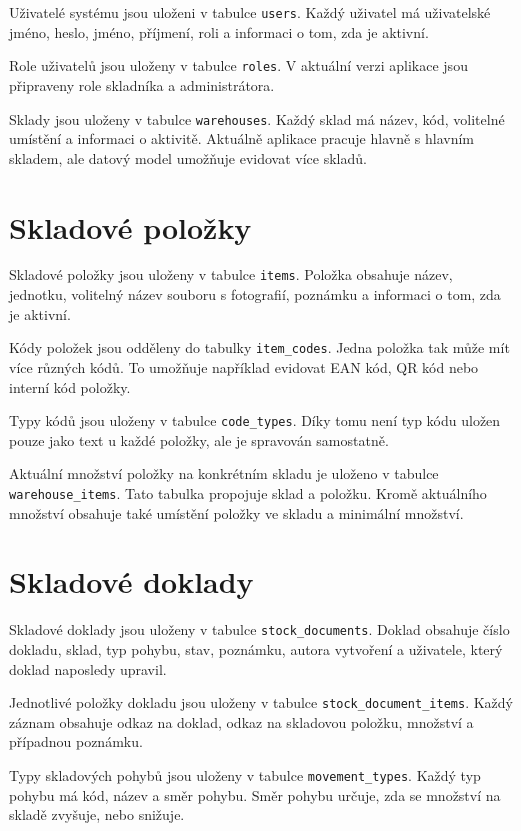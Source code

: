 \documentclass[czech, oth, kiv, he, pdf, viewonly]{fasthesis}
\begin{document}
Uživatelé systému jsou uloženi v tabulce \texttt{users}. Každý
uživatel má uživatelské jméno, heslo, jméno, příjmení, roli a informaci
o tom, zda je aktivní.

Role uživatelů jsou uloženy v tabulce \texttt{roles}. V aktuální verzi
aplikace jsou připraveny role skladníka a administrátora.

Sklady jsou uloženy v tabulce \texttt{warehouses}. Každý sklad má
název, kód, volitelné umístění a informaci o aktivitě. Aktuálně
aplikace pracuje hlavně s hlavním skladem, ale datový model umožňuje
evidovat více skladů.

\section{Skladové položky}

Skladové položky jsou uloženy v tabulce \texttt{items}. Položka
obsahuje název, jednotku, volitelný název souboru s fotografií,
poznámku a informaci o tom, zda je aktivní.

Kódy položek jsou odděleny do tabulky \texttt{item\_codes}. Jedna
položka tak může mít více různých kódů. To umožňuje například evidovat
EAN kód, QR kód nebo interní kód položky.

Typy kódů jsou uloženy v tabulce \texttt{code\_types}. Díky tomu není
typ kódu uložen pouze jako text u každé položky, ale je spravován
samostatně.

Aktuální množství položky na konkrétním skladu je uloženo v tabulce
\texttt{warehouse\_items}. Tato tabulka propojuje sklad a položku.
Kromě aktuálního množství obsahuje také umístění položky ve skladu
a minimální množství.

\section{Skladové doklady}

Skladové doklady jsou uloženy v tabulce \texttt{stock\_documents}.
Doklad obsahuje číslo dokladu, sklad, typ pohybu, stav, poznámku,
autora vytvoření a uživatele, který doklad naposledy upravil.

Jednotlivé položky dokladu jsou uloženy v tabulce
\texttt{stock\_document\_items}. Každý záznam obsahuje odkaz na doklad,
odkaz na skladovou položku, množství a případnou poznámku.

Typy skladových pohybů jsou uloženy v tabulce
\texttt{movement\_types}. Každý typ pohybu má kód, název a směr
pohybu. Směr pohybu určuje, zda se množství na skladě zvyšuje, nebo
snižuje.
\end{document}
